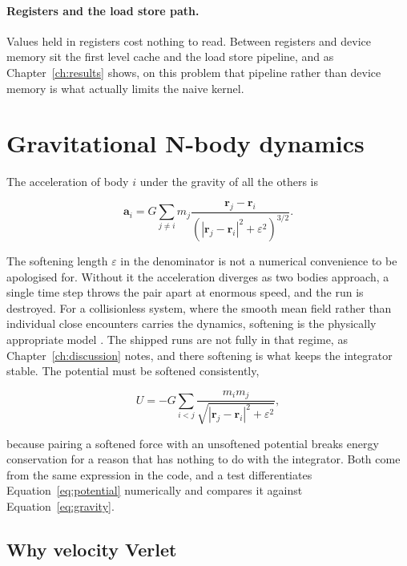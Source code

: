 \paragraph{Registers and the load store path.} Values held in registers cost
nothing to read. Between registers and device memory sit the first level cache
and the load store pipeline, and as Chapter~\ref{ch:results} shows, on this
problem that pipeline rather than device memory is what actually limits the
naive kernel.

\section{Gravitational N-body dynamics}

The acceleration of body $i$ under the gravity of all the others is

\begin{equation}
  \mathbf{a}_i = G \sum_{j \neq i} m_j
  \frac{\mathbf{r}_j - \mathbf{r}_i}
       {\left(\left|\mathbf{r}_j - \mathbf{r}_i\right|^2 + \varepsilon^2\right)^{3/2}}.
  \label{eq:gravity}
\end{equation}

The softening length $\varepsilon$ in the denominator is not a numerical
convenience to be apologised for. Without it the acceleration diverges as two
bodies approach, a single time step throws the pair apart at enormous speed,
and the run is destroyed. For a collisionless system, where the smooth mean
field rather than individual close encounters carries the dynamics, softening
is the physically appropriate model \cite{aarseth2003}. The shipped runs are not fully in
that regime, as Chapter~\ref{ch:discussion} notes, and there softening is what keeps the
integrator stable. The potential must be softened consistently,

\begin{equation}
  U = -G \sum_{i < j} \frac{m_i m_j}
      {\sqrt{\left|\mathbf{r}_j - \mathbf{r}_i\right|^2 + \varepsilon^2}},
  \label{eq:potential}
\end{equation}

because pairing a softened force with an unsoftened potential breaks energy
conservation for a reason that has nothing to do with the integrator. Both come
from the same expression in the code, and a test differentiates
Equation~\ref{eq:potential} numerically and compares it against
Equation~\ref{eq:gravity}.

\subsection{Why velocity Verlet}

